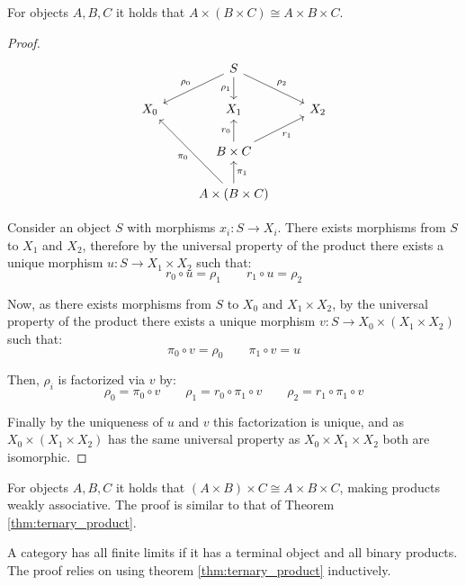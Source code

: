 \begin{theorem}\label{thm:ternary_product}
	For objects $A,B,C$ it holds that $A\times(B\times C)\cong A\times B\times C$.

	\begin{proof}
		\[\begin{tikzcd}[ampersand replacement=\&]
			\& S \\
			{X_0} \& {X_1} \& {X_2} \\
			\& {B\times C} \\
			\& {A\times(B\times C)}
			\arrow["{r_0}", from=3-2, to=2-2]
			\arrow["{r_1}"', from=3-2, to=2-3]
			\arrow["{\pi_0}", from=4-2, to=2-1]
			\arrow["{\pi_1}"', from=4-2, to=3-2]
			\arrow["{\rho_0}"', from=1-2, to=2-1]
			\arrow["{\rho_1}"', from=1-2, to=2-2]
			\arrow["{\rho_2}", from=1-2, to=2-3]
		\end{tikzcd}\]

		Consider an object $S$ with morphisms $x_i: S\to X_i$. There exists
		morphisms from $S$ to $X_1$ and $X_2$, therefore by the universal property
		of the product there exists a unique morphism $u: S\to X_1 \times X_2$ such
		that:
		\[
			r_0 \circ u = \rho_1
			\qquad
			r_1 \circ u = \rho_2
		\]

		Now, as there exists morphisms from $S$ to $X_0$ and $X_1\times X_2$, by the
		universal property of the product there exists a unique morphism $v: S \to
		X_0 \times(X_1 \times X_2)$ such that:
		\[
			\pi_0 \circ v = \rho_0
			\qquad
			\pi_1 \circ v = u
		\]

		Then, $\rho_i$ is factorized via $v$ by:
		\[
			\rho_0 = \pi_0 \circ v
			\qquad
			\rho_1 = r_0 \circ \pi_1 \circ v
			\qquad
			\rho_2 = r_1 \circ \pi_1 \circ v
		\]

		Finally by the uniqueness of $u$ and $v$ this factorization is unique, and
		as $X_0 \times(X_1 \times X_2)$ has the same universal property as $X_0
		\times X_1 \times X_2$ both are isomorphic.
	\end{proof}
\end{theorem}

\begin{proposition}
	For objects $A,B,C$ it holds that $(A\times B)\times C\cong A\times B\times
	C$, making products weakly associative. The proof is similar to that of Theorem \ref{thm:ternary_product}.
\end{proposition}

\begin{proposition}
	A category has all finite limits if it has a terminal object and all binary
	products. The proof relies on using theorem \ref{thm:ternary_product}
	inductively.
\end{proposition}

\newpage



